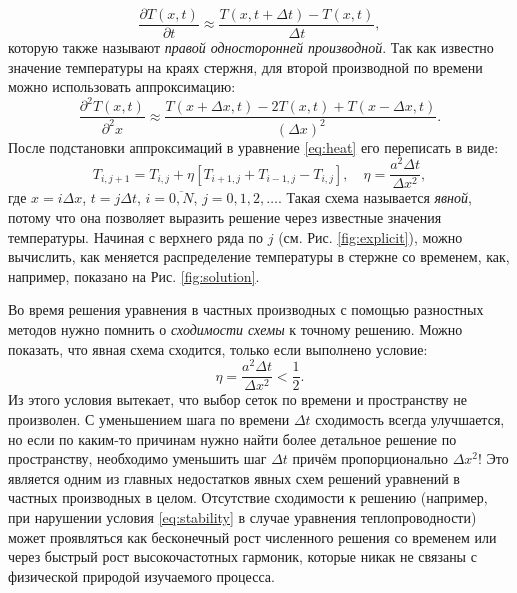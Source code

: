\documentclass[12pt]{article}
\begin{document}
%
\begin{equation}
\frac{\partial T(x, t)}{\partial t}\approx \frac{T(x,t+\Delta t)-T(x,t)}{\Delta t},
\end{equation}
%
которую также называют \textit{правой односторонней производной}. Так как известно значение температуры на краях стержня, для второй производной по времени можно использовать аппроксимацию:
%
\begin{equation}
\frac{\partial^2 T(x, t)}{\partial^2 x}\approx \frac{T(x+\Delta x,t)-2T(x,t)+T(x-\Delta x, t)}{(\Delta x)^2}.
\end{equation}
После подстановки аппроксимаций в уравнение \eqref{eq:heat} его переписать в виде:
%
\begin{equation}
T_{i,j+1}=T_{i,j}+\eta\left[T_{i+1,j}+T_{i-1,j}-T_{i,j}\right], \quad \eta=\frac{a^2 \Delta t}{\Delta x^2},
\end{equation}
%
где $x=i\Delta x$, $t=j\Delta t$, $i=\overline{0,N}$, $j=0,1,2,\ldots$. Такая схема называется \textit{явной}, потому что она позволяет выразить решение через известные значения температуры. Начиная с верхнего ряда по $j$ (см. Рис. \ref{fig:explicit}), можно вычислить, как меняется распределение температуры в стержне со временем, как, например, показано на Рис. \ref{fig:solution}.

Во время решения уравнения в частных производных с помощью разностных методов нужно помнить о \textit{сходимости схемы} к точному решению. Можно показать, что явная схема сходится, только если выполнено условие:
%
\begin{equation}
\eta=\frac{a^2\Delta t}{\Delta x^2}<\frac{1}{2}.
\label{eq:stability}
\end{equation}
%
Из этого условия вытекает, что выбор сеток по времени и пространству не произволен. С уменьшением шага по времени $\Delta t$ сходимость всегда улучшается, но если по каким-то причинам нужно найти более детальное решение по пространству, необходимо уменьшить шаг $\Delta t$ причём пропорционально $\Delta x^2$! Это является одним из главных недостатков явных схем решений уравнений в частных производных в целом. Отсутствие сходимости к решению (например, при нарушении условия \eqref{eq:stability} в случае уравнения теплопроводности) может проявляться как бесконечный рост численного решения со временем или через быстрый рост высокочастотных гармоник, которые никак не связаны с физической природой изучаемого процесса.
\end{document}
